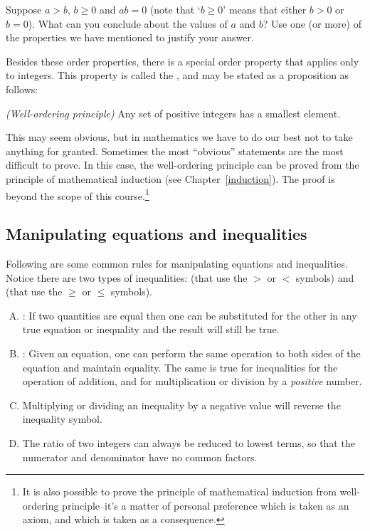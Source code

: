 \begin{exercise}{3}
Suppose $a > b$,  $b \ge 0$ and $ab = 0$ (note that `$b \ge 0$' means that either $b>0$ or $b=0$).  What can you conclude about the values of $a$ and $b$? Use one (or more)  of the properties we have mentioned to justify your answer.
\end{exercise}

Besides these order properties, there is a special order property that applies only to integers. This property is called the , and may be stated as a proposition as follows:

\begin{prop}{}\emph{(Well-ordering principle)}
Any set of positive integers  has a smallest element.
\end{prop}

\noindent
This may seem obvious, but in mathematics we have to do our best not to take anything for granted.  Sometimes the most ``obvious'' statements are the most difficult to prove. In this case, the well-ordering principle can be proved from the principle of mathematical induction (see Chapter~\ref{induction}). The proof is beyond the scope of this course.\footnote{It is also possible to prove the principle of mathematical induction from well-ordering principle--it's a matter of personal preference which is taken as an axiom, and which is taken as a consequence.}


\subsection {Manipulating equations and inequalities}\label{subsec:eqsAndIneqs}

Following are some common rules for manipulating equations and inequalities. Notice there are two types of inequalities:   (that use the $>$ or $<$ symbols) and  (that use the $\ge$ or $\le$ symbols). 

\begin{enumerate}[(A)]
\item
{}: If two quantities are equal then one can be substituted for the other in any true equation or inequality and the result will still be true. 
\item
{}: Given an equation, one can perform the same operation to both sides of the equation and maintain equality.  The same is true for inequalities for the operation of addition, and for multiplication or division by a \emph{positive} number.
\item
{}
Multiplying or dividing an inequality by a negative value will reverse the inequality symbol.
\item
{}
The ratio of two integers can always be reduced to lowest terms, so that the numerator and denominator have no common factors.
\end {enumerate}

